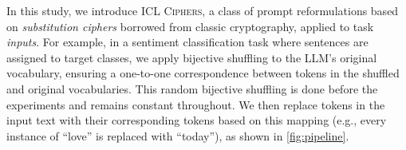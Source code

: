 \documentclass[11pt]{article}
\newcommand{\name}{\textsc{ICL Ciphers}}
\begin{document}



In this study, we introduce \name,
a class of prompt reformulations based on \emph{substitution ciphers} borrowed from classic cryptography, applied to task \textit{inputs}.
For example, in a sentiment classification task where sentences are assigned to target classes, we apply bijective shuffling to the LLM's original vocabulary, ensuring a one-to-one correspondence between tokens in the shuffled and original vocabularies. This random bijective shuffling is done before the experiments and remains constant throughout. We then replace tokens in the input text with their corresponding tokens based on this mapping (e.g., every instance of ``love'' is replaced with ``today''), as shown in \autoref{fig:pipeline}.




\end{document}
